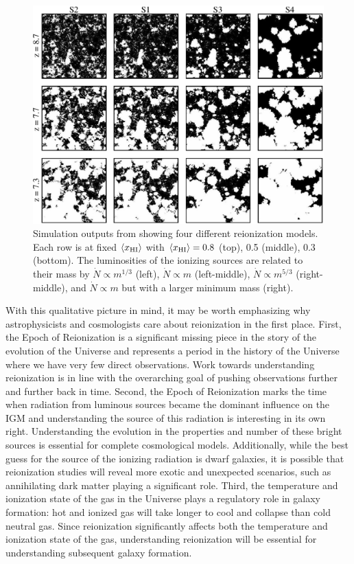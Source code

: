 \begin{figure}[!p]
  \centering
  \includegraphics[width=14cm]{McQuinnHIITopology.eps}
  \caption{Simulation outputs from \cite{McQuinn2007} showing four different reionization models. Each row is at fixed $\langle x_{\text{HI}}\rangle$ with $\langle x_{\text{HI}}\rangle = 0.8$ (top), 0.5 (middle), 0.3 (bottom). The luminosities of the ionizing sources are related to their mass by $\dot{N} \propto m^{1/3}$ (left), $\dot{N} \propto m$ (left-middle), $\dot{N}\propto m^{5/3}$ (right-middle), and $\dot{N} \propto m$ but with a larger minimum mass (right). }
  \label{fig:McQuinnMorph}
\end{figure}


With this qualitative picture in mind, it may be worth emphasizing why astrophysicists and cosmologists care about reionization in the first place. First, the Epoch of Reionization is a significant missing piece in the story of the evolution of the Universe and represents a period in the history of the Universe where we have very few direct observations. Work towards understanding reionization is in line with the overarching goal of pushing observations further and further back in time. Second, the Epoch of Reionization marks the time when radiation from luminous sources became the dominant influence on the IGM and understanding the source of this radiation is interesting in its own right. Understanding the evolution in the properties and number of these bright sources is essential for complete cosmological models. Additionally, while the best guess for the source of the ionizing radiation is dwarf galaxies, it is possible that reionization studies will reveal more exotic and unexpected scenarios, such as annihilating dark matter playing a significant role. Third, the temperature and ionization state of the gas in the Universe plays a regulatory role in galaxy formation: hot and ionized gas will take longer to cool and collapse than cold neutral gas. Since reionization significantly affects both the temperature and ionization state of the gas, understanding reionization will be essential for understanding subsequent galaxy formation. 


